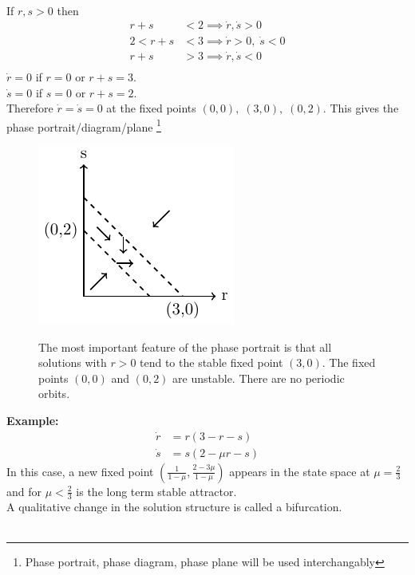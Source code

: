 \documentclass{article}
\newcommand{\example}{\textbf{Example:}}                    %
\begin{document}
\\
If $r,s >0$ then
\begin{align*}
r+s &< 2 \implies \dot{r}, \dot{s} > 0 \\
2 < r+s &< 3 \implies \dot{r} >0 , \; \dot{s} < 0 \\
r+s &> 3 \implies \dot{r}, \dot{s} < 0 \\
\end{align*}
$\dot{r} = 0$ if $r=0$ or $r+s = 3$. \\
$\dot{s} = 0$ if $s=0$ or $r+s = 2$. \\
Therefore $\dot{r} = \dot{s} = 0$ at the fixed points $(0,0), \; (3,0), \; (0,2)$.
This gives the phase portrait/diagram/plane%
\footnote{Phase portrait, phase diagram, phase plane will be used interchangably}
\begin{figure}[H]
\begin{minipage}[c]{0.35\linewidth}
\includegraphics{Fig1.pdf}
\end{minipage}
\begin{minipage}[c]{0.55\linewidth}
The most important feature of the phase portrait is that all solutions with 
$r >0$ tend to the stable fixed point $(3,0)$. The fixed points $(0,0)$ and
$(0,2)$ are unstable. There are no periodic orbits.
\end{minipage}
\end{figure}
\noindent
\example\   
\begin{align*}
\dot{r} &= r(3 - r -s) \\
\dot{s} &= s(2 - \mu r -s)
\end{align*}
In this case, a new fixed point 
$\displaystyle \left(\frac{1}{1- \mu} , \frac{2 - 3 \mu}{1- \mu} \right)$
appears in the state space at $\mu = \frac{2}{3}$ and for $\mu < \frac{2}{3}$ 
is the long term stable attractor. 
\\
A qualitative change in the solution structure is called a bifurcation.
\\
\\
\end{document}
